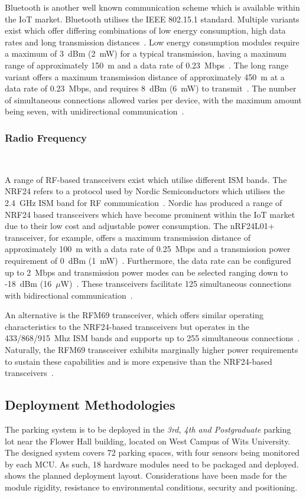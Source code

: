 \documentclass[10pt,twocolumn]{witseiepaper}
\begin{document}
			Bluetooth is another well known communication scheme which is available within the IoT market. Bluetooth utilises the IEEE 802.15.1 standard. Multiple variants exist which offer differing combinations of low energy consumption, high data rates and long transmission distances~\cite{802.15.2}. Low energy consumption modules require a maximum of 3~dBm (2~mW) for a typical transmission, having a maximum range of approximately 150~m and a data rate of 0.23~Mbps~\cite{BLE112}. The long range variant offers a maximum transmission distance of approximately 450~m at a data rate of 0.23~Mbps, and requires 8~dBm (6~mW) to transmit~\cite{BLE112LR}. The number of simultaneous connections allowed varies per device, with the maximum amount being seven, with unidirectional communication~\cite{bluetooth-users}.

		\subsubsection{Radio Frequency} $   $
		
			A range of RF-based transceivers exist which utilise different ISM bands. The NRF24 refers to a protocol used by Nordic Semiconductors which utilises the 2.4~GHz ISM band for RF communication~\cite{nrf24}. Nordic has produced a range of NRF24 based transceivers which have become prominent within the IoT market due to their low cost and adjustable power consumption. The nRF24L01+ transceiver, for example, offers a maximum transmission distance of approximately 100~m with a data rate of 0.25~Mbps and a transmission power requirement of 0~dBm (1~mW)~\cite{nrf24}. Furthermore, the data rate can be configured up to 2~Mbps and transmission power modes can be selected ranging down to -18~dBm (16~$\mu$W)~\cite{nrf24}. These transceivers facilitate 125 simultaneous connections with bidirectional communication~\cite{nrf24}.
			
			An alternative is the RFM69 transceiver, which offers similar operating characteristics to the NRF24-based transceivers but operates in the 433/868/915~Mhz ISM bands and supports up to 255 simultaneous connections~\cite{rfm69}. Naturally, the RFM69 transceiver exhibits marginally higher power requirements to sustain these capabilities and is more expensive than the NRF24-based transceivers~\cite{rfm69}.
	
	\subsection{Deployment Methodologies}
		The parking system is to be deployed in the \textit{3rd, 4th and Postgraduate} parking lot near the Flower Hall building, located on West Campus of Wits University. The designed system covers 72 parking spaces, with four sensors being monitored by each MCU. As such, 18 hardware modules need to be packaged and deployed.  shows the planned deployment layout. Considerations have been made for the module rigidity, resistance to environmental conditions, security and positioning.
		
\end{document}
